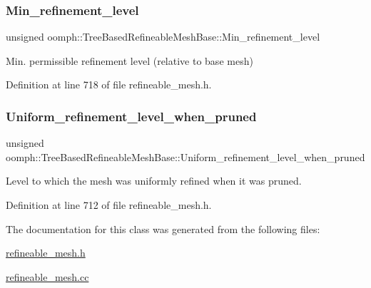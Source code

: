 \subsubsection{\texorpdfstring{Min\+\_\+refinement\+\_\+level}{Min\_refinement\_level}}
{\footnotesize\ttfamily unsigned oomph\+::\+Tree\+Based\+Refineable\+Mesh\+Base\+::\+Min\+\_\+refinement\+\_\+level\hspace{0.3cm}{\ttfamily [protected]}}



Min. permissible refinement level (relative to base mesh) 



Definition at line 718 of file refineable\+\_\+mesh.\+h.

\mbox{\label{classoomph_1_1TreeBasedRefineableMeshBase_a1a69da6d99f1776f53209940d40eaaa3}} 
\subsubsection{\texorpdfstring{Uniform\+\_\+refinement\+\_\+level\+\_\+when\+\_\+pruned}{Uniform\_refinement\_level\_when\_pruned}}
{\footnotesize\ttfamily unsigned oomph\+::\+Tree\+Based\+Refineable\+Mesh\+Base\+::\+Uniform\+\_\+refinement\+\_\+level\+\_\+when\+\_\+pruned\hspace{0.3cm}{\ttfamily [protected]}}



Level to which the mesh was uniformly refined when it was pruned. 



Definition at line 712 of file refineable\+\_\+mesh.\+h.



The documentation for this class was generated from the following files\+:\begin{DoxyCompactItemize}
\item 
\hyperlink{refineable__mesh_8h}{refineable\+\_\+mesh.\+h}\item 
\hyperlink{refineable__mesh_8cc}{refineable\+\_\+mesh.\+cc}\end{DoxyCompactItemize}
